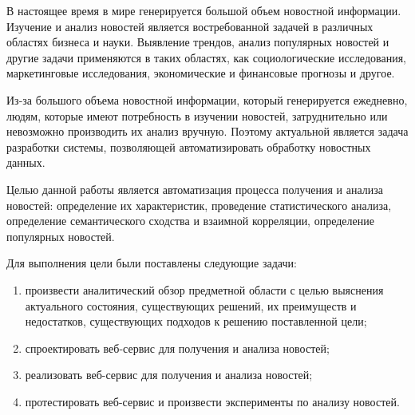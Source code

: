 \aftertitle

В настоящее время в мире генерируется большой объем новостной информации. Изучение и анализ новостей является востребованной задачей в различных областях бизнеса и науки. Выявление трендов, анализ популярных новостей и другие задачи применяются в таких областях, как социологические исследования, маркетинговые исследования, экономические и финансовые прогнозы и другое.

Из-за большого объема новостной информации, который генерируется ежедневно, людям, которые имеют потребность в изучении новостей, затруднительно или невозможно производить их анализ вручную. Поэтому актуальной является задача разработки системы, позволяющей автоматизировать обработку новостных данных.

Целью данной работы является автоматизация процесса получения и анализа новостей: определение их характеристик, проведение статистического анализа, определение семантического сходства и взаимной корреляции, определение популярных новостей.

Для выполнения цели были поставлены следующие задачи:
\begin{enumerate}
    \item произвести аналитический обзор предметной области с целью выяснения актуального состояния, существующих решений, их преимуществ и недостатков, существующих подходов к решению поставленной цели;
    \item спроектировать веб-сервис для получения и анализа новостей;
    \item реализовать веб-сервис для получения и анализа новостей;
    \item протестировать веб-сервис и произвести эксперименты по анализу новостей.
\end{enumerate}
